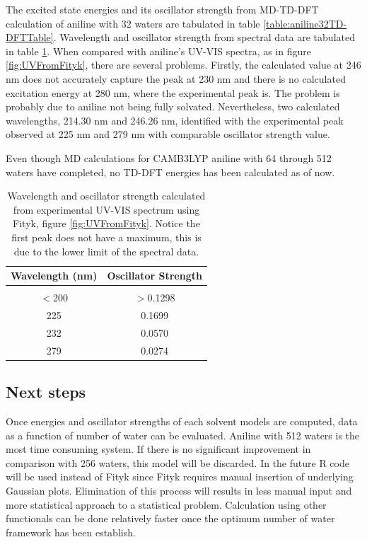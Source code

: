 \documentclass[
journal=jpcbfk, %
manuscript=article]{achemso}
\begin{document}
The excited state energies and its oscillator strength from MD-TD-DFT calculation of aniline with 32 waters are tabulated in table \ref{table:aniline32TD-DFTTable}. Wavelength and oscillator strength from spectral data are tabulated in table \ref{table:anilineUVTable}. When compared with aniline's UV-VIS spectra, as in figure \ref{fig:UVFromFityk}, there are several problems. Firstly, the calculated value at 246 nm does not accurately capture the peak at 230 nm and there is no calculated excitation energy at 280 nm, where the experimental peak is. The problem is probably due to aniline not being fully solvated. Nevertheless, two calculated wavelengths, 214.30 nm and 246.26 nm, identified with the experimental peak observed at 225 nm and 279 nm with comparable oscillator strength value.

Even though MD calculations for CAMB3LYP aniline with 64 through 512 waters have completed, no TD-DFT energies has been calculated as of now. 

\begin{table}[ht]
	\caption{Wavelength and oscillator strength calculated from experimental UV-VIS spectrum using Fityk, figure \ref{fig:UVFromFityk}. Notice the first peak does not have a maximum, this is due to the lower limit of the spectral data.}
	\label{table:anilineUVTable}
	\centering
	\begin{tabular}{c c}
		Wavelength (nm) & Oscillator Strength\\ [1ex] %
		\hline\hline
		\\[-0.5ex]
		$<$200&$>$0.1298\\ 
		225&0.1699\\
		232&0.0570\\
		279&0.0274\\ 
	\end{tabular}
\end{table}

\subsection{Next steps}
Once energies and oscillator strengths of each solvent models are computed, data as a function of number of water can be evaluated. Aniline with 512 waters is the most time consuming system. If there is no significant improvement in comparison with 256 waters, this model will be discarded. 
In the future R code will be used instead of Fityk since Fityk requires manual insertion of underlying Gaussian plots. Elimination of this process will results in less manual input and more statistical approach to a statistical problem. Calculation using other functionals can be done relatively faster once the optimum number of water framework has been establish.
\end{document}
